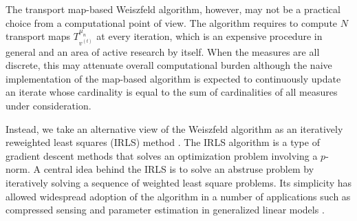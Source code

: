\documentclass[11pt]{article}
\begin{document}
The transport map-based Weiszfeld algorithm, however, may not be a practical choice from a computational point of view. The algorithm requires to compute $N$ transport maps $T_{v^{(t)}}^{\mu_n}$ at every iteration, which is an expensive procedure in general and an area of active research by itself. When the measures are all discrete, this may attenuate overall computational burden although the naive implementation of the map-based algorithm is expected to continuously update an iterate whose cardinality is equal to the sum of cardinalities of all measures under consideration. 

Instead, we take an alternative view of the Weiszfeld algorithm as an iteratively reweighted least squares (IRLS) method \citep{lawson_1961_ContributionsTheoryLinear, rice_1964_ApproximationsFunctions, osborne_1985_FiniteAlgorithmsOptimization}. The IRLS algorithm is a type of gradient descent methods that solves an optimization problem involving a $p$-norm. A central idea behind the IRLS is to solve an abstruse problem by iteratively solving a sequence of weighted least square problems. Its simplicity has allowed widespread adoption of the algorithm in a number of applications such as  compressed sensing \citep{gorodnitsky_1997_SparseSignalReconstruction, chartrand_2008_IterativelyReweightedAlgorithms, daubechies_2010_IterativelyReweightedLeast} and parameter estimation in generalized linear models \citep{nelder_1972_GeneralizedLinearModels, mccullagh_1998_GeneralizedLinearModels}.
\end{document}
